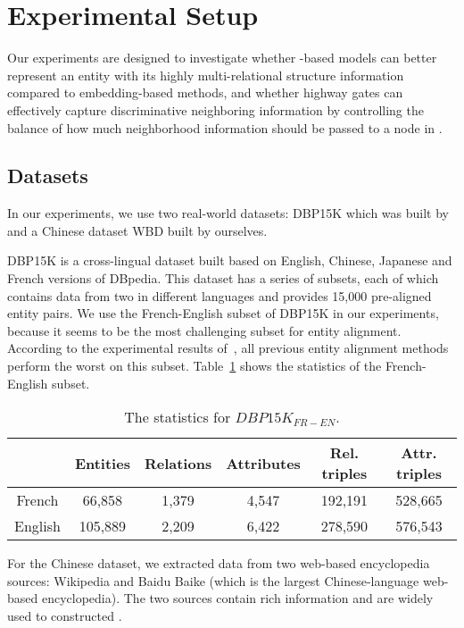 \section{Experimental Setup}
	Our experiments are designed to investigate whether \RGCN-based models can better represent an entity with its highly multi-relational
structure information compared to \KG embedding-based methods, and whether highway gates can effectively capture discriminative neighboring
information by controlling the balance of how much neighborhood information should be passed to a node in \RGCN.

\subsection{Datasets}
\label{subsection:datasets}
	In our experiments, we use two real-world datasets: DBP15K which was built by~\cite{sun2017cross} and a Chinese dataset WBD built by ourselves.
	
	DBP15K is a cross-lingual dataset built based on English, Chinese, Japanese and French versions of DBpedia.
	This dataset has a series of subsets, each of which contains data from two \KGs in different languages and provides 15,000 pre-aligned entity pairs.
	We use the French-English subset of DBP15K in our experiments, because it seems to be the most challenging subset for entity alignment.
	According to the experimental results of~\cite{sun2017cross}, all previous entity alignment methods perform the worst on this subset. Table~\ref{dbp} shows the statistics of the French-English subset.
	
		\begin{table}
		\centering
		\scriptsize
		\begin{tabular}{c|ccccc}
			\toprule
			&\bf  Entities &\bf  Relations &\bf  Attributes &\bf  Rel. triples &\bf  Attr. triples \\
			\midrule
			French & 66,858 & 1,379 & 4,547 & 192,191 & 528,665 \\
			English & 105,889 & 2,209 & 6,422 & 278,590 & 576,543 \\
			\bottomrule
		\end{tabular}
		\caption{The statistics for $DBP15K_{FR-EN}$.}
		\label{dbp}
	\end{table}
	
    For the Chinese dataset, we extracted data from two web-based encyclopedia sources: Wikipedia and Baidu Baike (which is the largest Chinese-language web-based encyclopedia).
    The two sources contain rich information and are widely used to constructed \KGs.
	

